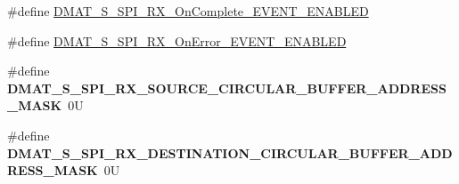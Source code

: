 \begin{DoxyCompactItemize}
\item 
\#define \hyperlink{group___d_m_a_t___s___s_p_i___r_x__module_ga27e11548ef5b4f6595c5d47c4af9b137}{D\-M\-A\-T\-\_\-\-S\-\_\-\-S\-P\-I\-\_\-\-R\-X\-\_\-\-On\-Complete\-\_\-\-E\-V\-E\-N\-T\-\_\-\-E\-N\-A\-B\-L\-E\-D}
\item 
\#define \hyperlink{group___d_m_a_t___s___s_p_i___r_x__module_ga1c79caf32cdb772e0bb28a14573d6be9}{D\-M\-A\-T\-\_\-\-S\-\_\-\-S\-P\-I\-\_\-\-R\-X\-\_\-\-On\-Error\-\_\-\-E\-V\-E\-N\-T\-\_\-\-E\-N\-A\-B\-L\-E\-D}
\item 
\hypertarget{group___d_m_a_t___s___s_p_i___r_x__module_gafffcaccd73edeb2ce0792527808ba9c4}{\#define {\bfseries D\-M\-A\-T\-\_\-\-S\-\_\-\-S\-P\-I\-\_\-\-R\-X\-\_\-\-S\-O\-U\-R\-C\-E\-\_\-\-C\-I\-R\-C\-U\-L\-A\-R\-\_\-\-B\-U\-F\-F\-E\-R\-\_\-\-A\-D\-D\-R\-E\-S\-S\-\_\-\-M\-A\-S\-K}~0\-U}\label{group___d_m_a_t___s___s_p_i___r_x__module_gafffcaccd73edeb2ce0792527808ba9c4}

\item 
\hypertarget{group___d_m_a_t___s___s_p_i___r_x__module_gacd0eb1a486eada5d75b249564790b2f1}{\#define {\bfseries D\-M\-A\-T\-\_\-\-S\-\_\-\-S\-P\-I\-\_\-\-R\-X\-\_\-\-D\-E\-S\-T\-I\-N\-A\-T\-I\-O\-N\-\_\-\-C\-I\-R\-C\-U\-L\-A\-R\-\_\-\-B\-U\-F\-F\-E\-R\-\_\-\-A\-D\-D\-R\-E\-S\-S\-\_\-\-M\-A\-S\-K}~0\-U}\label{group___d_m_a_t___s___s_p_i___r_x__module_gacd0eb1a486eada5d75b249564790b2f1}

\end{DoxyCompactItemize}
